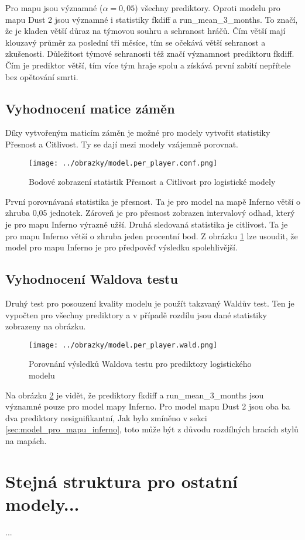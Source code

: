 Pro mapu jsou významné ($\alpha = 0,05$) všechny prediktory. Oproti modelu pro mapu Dust 2 jsou významné i statistiky fkdiff a run\_mean\_3\_months. To značí, že je 
kladen větší důraz na týmovou souhru a sehranost hráčů. Čím větší mají klouzavý průměr za poslední tři měsíce, tím se očekává větší sehranost a zkušenosti.
Důležitost týmové sehranosti též značí významnost prediktoru fkdiff. Čím je prediktor větší, tím více tým hraje spolu a získává první zabití nepřítele bez opětování smrti. 

\newpage
\subsection{Vyhodnocení matice záměn}
Díky vytvořeným maticím záměn je možné pro modely vytvořit statistiky Přesnost a Citlivost. Ty se dají mezi modely vzájemně porovnat.

\begin{figure}[H]
    \centering
    \texttt{[image: ../obrazky/model.per\_player.conf.png]}
    \caption{Bodové zobrazení statistik Přesnost a Citlivost pro logistické modely} 
    \label{fig:model.per_player.conf}
\end{figure}

První porovnávaná statistika je přesnost. Ta je pro model na mapě Inferno větší o zhruba 0,05 jednotek. Zároveň je pro přesnost zobrazen intervalový odhad, který je pro
mapu Inferno výrazně užší. Druhá sledovaná statistika je citlivost. Ta je pro mapu Inferno větší o zhruba jeden procentní bod. Z obrázku \ref{fig:model.per_player.conf}
lze usoudit, že model pro mapu Inferno je pro předpověď výsledku spolehlivější.

\newpage
\subsection{Vyhodnocení Waldova testu}
Druhý test pro posouzení kvality modelu je použít takzvaný Waldův test. Ten je vypočten pro všechny prediktory a v případě rozdílu jsou dané statistiky
zobrazeny na obrázku.

\begin{figure}[H]
    \centering
    \texttt{[image: ../obrazky/model.per\_player.wald.png]}
    \caption{Porovnání výsledků Waldova testu pro prediktory logistického modelu} 
    \label{fig:model.per_player.wald}
\end{figure}

Na obrázku \ref{fig:model.per_player.wald} je vidět, že prediktory fkdiff a run\_mean\_3\_months jsou významné pouze pro model mapy Inferno. Pro model
mapu Dust 2 jsou oba ba dva prediktory nesignifikantní, Jak bylo zmíněno v sekci \ref{sec:model_pro_mapu_inferno}, toto může být z důvodu rozdílných
hracích stylů na mapách.

\section{Stejná struktura pro ostatní modely...}
...